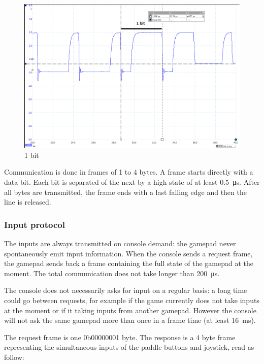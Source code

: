 \documentclass[a4paper,oneside,12pt]{article}
\begin{document}
\begin{figure}
  \includegraphics[width=\textwidth]{1bit.png}
  \caption{1 bit}
  \label{1bit}
\end{figure}

Communication is done in frames of 1 to 4 bytes. A frame starts directly with a
data bit. Each bit is separated of the next by a high state of at least
\SI{0.5}{\us}. After all bytes are transmitted, the frame ends with a last
falling edge and then the line is released.

\subsubsection{Input protocol}
The inputs are always transmitted on console demand: the gamepad never
spontaneously emit input information. When the console sends a request frame,
the gamepad sends back a frame containing the full state of the gamepad at the
moment. The total communication does not take longer than \SI{200}{\us}.

The console does not necessarily asks for input on a regular basis: a long time
could go between requests, for example if the game currently does not take
inputs at the moment or if it taking inputs from another gamepad. However the
console will not ask the same gamepad more than once in a frame time (at least
\SI{16}{\ms}).

The request frame is one 0b00000001 byte.
The response is a 4 byte frame representing the simultaneous inputs of the
paddle buttons and joystick, read as follow:
\end{document}
